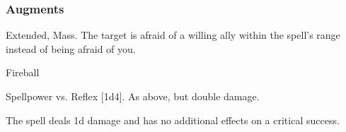 \subsubsection{Augments}
 Extended, Mass.
The target is afraid of a willing ally within the spell's range instead of being afraid of you.
\begin{spellsection}{Fireball}
\begin{spellheader}
\end{spellheader}
\begin{spellcontent}
\begin{spelltargetinginfo}
\end{spelltargetinginfo}
\begin{spelleffects}
\begin{spellattack}{Spellpower vs. Reflex}
\spellsuccess {}[1d4].
\spellcritical As above, but double damage.
\end{spellattack}
\end{spelleffects}
\end{spellcontent}
\begin{spellfooter}
\miscastexplode
\end{spellfooter}
\begin{spellcantrip}
The spell deals \minus1d damage and has no additional effects on a critical success.
\end{spellcantrip}
\end{spellsection}
